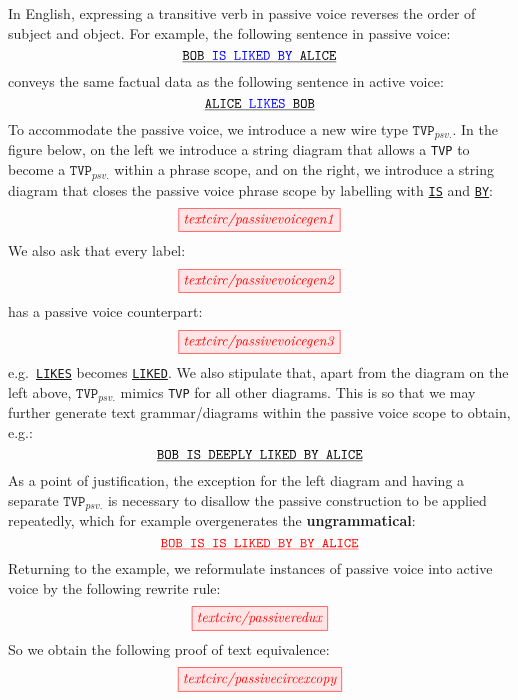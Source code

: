 \begin{example}
In English, expressing a transitive verb in passive voice reverses the order of subject and object. For example, the following sentence in passive voice:
\[
\texttt{\underline{BOB \bB IS LIKED BY\e ALICE}}
\]
conveys the same factual data as the following sentence in active voice:
\[
\texttt{\underline{ALICE \bB LIKES\e BOB}}
\]
To accommodate the passive voice, we introduce a new wire type $\texttt{TVP}_{psv.}$. In the figure below, on the left we introduce a string diagram that allows a \texttt{TVP} to become a $\texttt{TVP}_{psv.}$ within a phrase scope, and on the right, we introduce a string diagram that closes the passive voice phrase scope by labelling with \texttt{\underline{IS}} and \texttt{\underline{BY}}:
\[
\tikzfig{textcirc/passivevoicegen1}
\]
We also ask that every label: 
\[
\tikzfig{textcirc/passivevoicegen2}
\]
has a passive voice counterpart:    
\[
\tikzfig{textcirc/passivevoicegen3}
\]
e.g.~\texttt{\underline{LIKES}} becomes \texttt{\underline{LIKED}}.
We also stipulate that, apart from the diagram on the left above, $\texttt{TVP}_{psv.}$ mimics \texttt{TVP} for all other diagrams. This is so that we may further generate text grammar/diagrams  
within the passive voice scope to obtain, e.g.:
\[
\texttt{\underline{BOB IS DEEPLY LIKED BY ALICE}}
\]
As a point of justification, the exception for the left diagram and having a separate $\texttt{TVP}_{psv.}$ is necessary to disallow the passive construction to be applied repeatedly, which for example overgenerates the \bR\textbf{ungrammatical}\e:
\[
\bR \texttt{\underline{BOB IS IS LIKED BY BY ALICE}} \e
\]
Returning to the example, we reformulate instances of passive voice into active voice by the following rewrite rule:
\[
\tikzfig{textcirc/passiveredux}
\]
So we obtain the following proof of text equivalence:
\[
\tikzfig{textcirc/passivecircexcopy}
\]
\end{example}  

